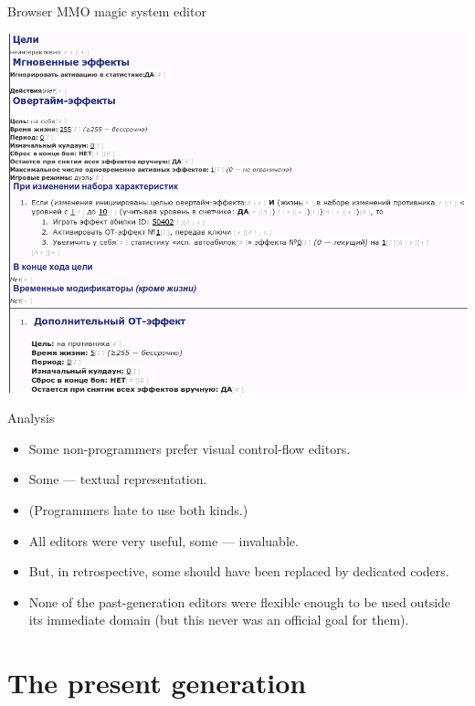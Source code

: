\documentclass[handout]{beamer}
\begin{document}
\begin{frame}{Browser MMO magic system editor}

\includegraphics[height=.8\textheight]{magic}

\end{frame}


\begin{frame}{Analysis}

\begin{itemize}
\item Some non-programmers prefer visual control-flow editors.
\item Some — textual representation.
\item (Programmers hate to use both kinds.)
\item All editors were very useful, some — invaluable.
\item But, in retrospective, some should have been replaced by dedicated coders.
\item None of the past-generation editors were flexible enough to be
used outside its immediate domain (but this never was an official goal
for them).
\end{itemize}

\end{frame}


\section{The present generation}
\end{document}

